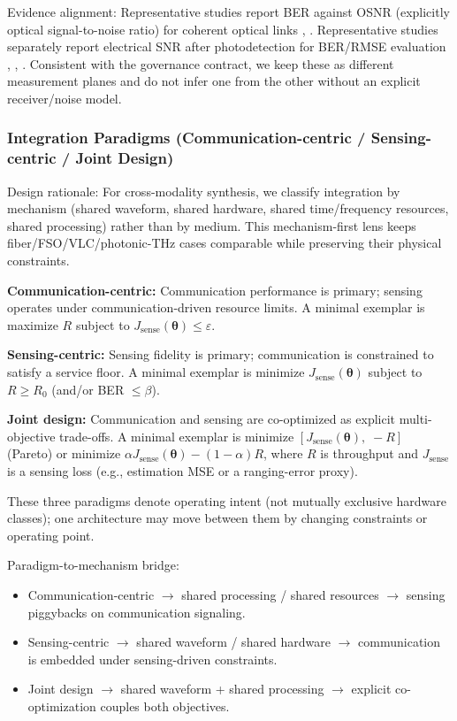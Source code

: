 Evidence alignment: Representative studies report BER against OSNR (explicitly optical signal-to-noise ratio) for coherent optical links \cite{O_ISAC_132}, \cite{O_ISAC_076}.
Representative studies separately report electrical SNR after photodetection for BER/RMSE evaluation \cite{O_ISAC_061}, \cite{O_ISAC_100}, \cite{O_ISAC_023}. Consistent with the governance contract, we keep these as different measurement planes and do not infer one from the other without an explicit receiver/noise model.

\subsubsection{Integration Paradigms (Communication-centric / Sensing-centric / Joint Design)}
Design rationale: For cross-modality synthesis, we classify integration by mechanism (shared waveform, shared hardware, shared time/frequency resources, shared processing) rather than by medium. This mechanism-first lens keeps fiber/FSO/VLC/photonic-THz cases comparable while preserving their physical constraints.

\textbf{Communication-centric:} Communication performance is primary; sensing operates under communication-driven resource limits. A minimal exemplar is maximize \(R\) subject to \(J_{\text{sense}}(\boldsymbol{\theta})\le \varepsilon\).

\textbf{Sensing-centric:} Sensing fidelity is primary; communication is constrained to satisfy a service floor. A minimal exemplar is minimize \(J_{\text{sense}}(\boldsymbol{\theta})\) subject to \(R\ge R_0\) (and/or BER \(\le \beta\)).

\textbf{Joint design:} Communication and sensing are co-optimized as explicit multi-objective trade-offs. A minimal exemplar is minimize \([J_{\text{sense}}(\boldsymbol{\theta}),\; -R]\) (Pareto) or minimize \(\alpha J_{\text{sense}}(\boldsymbol{\theta})-(1-\alpha)R\), where \(R\) is throughput and \(J_{\text{sense}}\) is a sensing loss (e.g., estimation MSE or a ranging-error proxy).

These three paradigms denote operating intent (not mutually exclusive hardware classes); one architecture may move between them by changing constraints or operating point.

Paradigm-to-mechanism bridge:
\begin{itemize}
    \item Communication-centric $\rightarrow$ shared processing / shared resources $\rightarrow$ sensing piggybacks on communication signaling.
    \item Sensing-centric $\rightarrow$ shared waveform / shared hardware $\rightarrow$ communication is embedded under sensing-driven constraints.
    \item Joint design $\rightarrow$ shared waveform + shared processing $\rightarrow$ explicit co-optimization couples both objectives.
\end{itemize}

